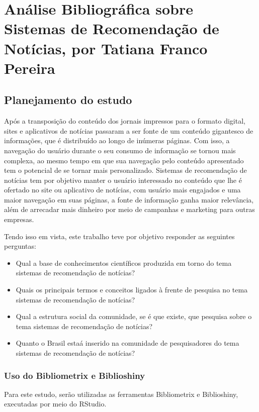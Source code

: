 \chapter{Análise Bibliográfica sobre Sistemas de Recomendação de Notícias, por Tatiana Franco Pereira\label{chap:bibliometria:Tatianafp}}

\section{Planejamento do estudo}

Após a transposição do conteúdo dos jornais impressos para o formato digital, sites e aplicativos de notícias passaram a ser fonte de um conteúdo gigantesco de informações, que é distribuído ao longo de inúmeras páginas. Com isso, a navegação do usuário durante o seu consumo de informação se tornou mais complexa, ao mesmo tempo em que sua navegação pelo conteúdo apresentado tem o potencial de se tornar mais personalizado. Sistemas de recomendação de notícias tem por objetivo manter o usuário interessado no conteúdo que lhe é ofertado no site ou aplicativo de notícias, com usuário mais engajados e uma maior navegação em suas páginas, a fonte de informação ganha maior relevância, além de arrecadar mais dinheiro por meio de campanhas e marketing para outras empresas. 

Tendo isso em vista, este trabalho teve por objetivo responder as seguintes perguntas:
\begin{itemize}
    \item Qual a base de conhecimentos científicos produzida em torno do tema sistemas de recomendação de notícias? 
    \item Quais os principais termos e conceitos ligados à frente de pesquisa no tema sistemas de recomendação de notícias? 
    \item Qual a estrutura social da comunidade, se é que existe, que pesquisa sobre o tema sistemas de recomendação de notícias?
    \item Quanto o Brasil estaá inserido na comunidade de pesquisadores do tema sistemas de recomendação de notícias? 
\end{itemize}

\subsection{Uso do Bibliometrix e Biblioshiny}

Para este estudo, serão utilizadas as ferramentas Bibliometrix e Biblioshiny, executadas por meio do RStudio.

